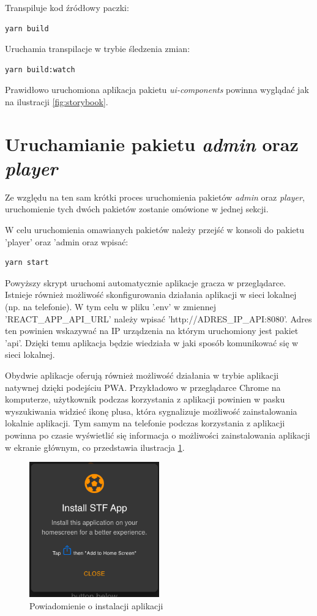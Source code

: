 Transpiluje kod źródłowy paczki:
\begin{lstlisting}
yarn build
\end{lstlisting}

Uruchamia transpilacje w trybie śledzenia zmian:
\begin{lstlisting}
yarn build:watch
\end{lstlisting}

Prawidłowo uruchomiona aplikacja pakietu \textit{ui-components} powinna wyglądać jak na ilustracji \ref{fig:storybook}.

\section{Uruchamianie pakietu \textit{admin} oraz \textit{player}}
Ze względu na ten sam krótki proces uruchomienia pakietów \textit{admin} oraz \textit{player}, uruchomienie tych dwóch pakietów zostanie omówione w jednej sekcji.

W celu uruchomienia omawianych pakietów należy przejść w konsoli do pakietu 'player' oraz 'admin oraz wpisać:

\begin{lstlisting}
yarn start
\end{lstlisting}

Powyższy skrypt uruchomi automatycznie aplikacje gracza w przeglądarce. Istnieje również możliwość skonfigurowania działania aplikacji w sieci lokalnej (np. na telefonie). W tym celu w pliku '.env' w zmiennej 'REACT\_APP\_API\_URL' należy wpisać 'http://{ADRES\_IP\_API}:8080'. Adres ten powinien wskazywać na IP urządzenia na którym uruchomiony jest pakiet 'api'. Dzięki temu aplikacja będzie wiedziała w jaki sposób komunikować się w sieci lokalnej.

Obydwie aplikacje oferują również możliwość działania w trybie aplikacji natywnej dzięki podejściu PWA. Przykładowo w przeglądarce Chrome na komputerze, użytkownik podczas korzystania z aplikacji powinien w pasku wyszukiwania widzieć ikonę plusa, która sygnalizuje możliwość zainstalowania lokalnie aplikacji. Tym samym na telefonie podczas korzystania z aplikacji powinna po czasie wyświetlić się informacja o możliwości zainstalowania aplikacji w ekranie głównym, co przedstawia ilustracja \ref{fig:pwa_promt}.

\begin{figure}[h!]
  \centering
    \includegraphics[width=0.5\textwidth]{images/player/PWA_promt.png}
  \caption{Powiadomienie o instalacji aplikacji}
  \label{fig:pwa_promt}
\end{figure}


